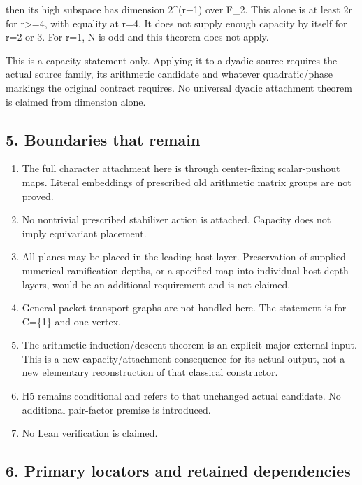 then its high subspace has dimension 2\^{}(r−1) over F\_2. This alone is
at least 2r for r\textgreater=4, with equality at r=4. It does not
supply enough capacity by itself for r=2 or 3. For r=1, N is odd and this
theorem does not apply.

This is a capacity statement only. Applying it to a dyadic source
requires the actual source family, its arithmetic candidate and whatever
quadratic/phase markings the original contract requires. No universal
dyadic attachment theorem is claimed from dimension alone.

\hypertarget{odd_capacity-boundaries-that-remain}{%
\subsection{5. Boundaries that remain}\label{odd_capacity-boundaries-that-remain}}

\begin{enumerate}
\def\labelenumi{\arabic{enumi}.}
\tightlist
\item
  The full character attachment here is through center-fixing
  scalar-pushout maps. Literal embeddings of prescribed old arithmetic
  matrix groups are not proved.
\item
  No nontrivial prescribed stabilizer action is attached. Capacity does
  not imply equivariant placement.
\item
  All planes may be placed in the leading host layer. Preservation of
  supplied numerical ramification depths, or a specified map into
  individual host depth layers, would be an additional requirement and
  is not claimed.
\item
  General packet transport graphs are not handled here. The statement is
  for C=\{1\} and one vertex.
\item
  The arithmetic induction/descent theorem is an explicit major external
  input. This is a new capacity/attachment consequence for its actual
  output, not a new elementary reconstruction of that classical
  constructor.
\item
  H5 remains conditional and refers to that unchanged actual candidate.
  No additional pair-factor premise is introduced.
\item
  No Lean verification is claimed.
\end{enumerate}

\hypertarget{odd_capacity-primary-locators-and-retained-dependencies}{%
\subsection{6. Primary locators and retained
dependencies}\label{odd_capacity-primary-locators-and-retained-dependencies}}

